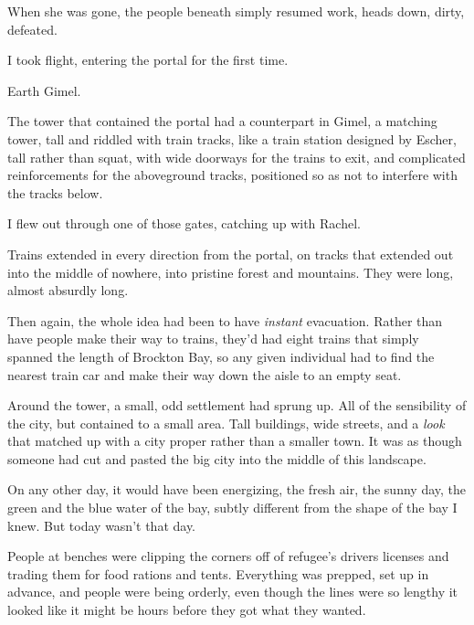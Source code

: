 When she was gone, the people beneath simply resumed work, heads down, dirty, defeated.



I took flight, entering the portal for the first time.



Earth Gimel.



The tower that contained the portal had a counterpart in Gimel, a matching tower, tall and riddled with train tracks, like a train station designed by Escher, tall rather than squat, with wide doorways for the trains to exit, and complicated reinforcements for the aboveground tracks, positioned so as not to interfere with the tracks below.



I flew out through one of those gates, catching up with Rachel.



Trains extended in every direction from the portal, on tracks that extended out into the middle of nowhere, into pristine forest and mountains.  They were long, almost absurdly long.



Then again, the whole idea had been to have \emph{instant} evacuation.  Rather than have people make their way to trains, they'd had eight trains that simply spanned the length of Brockton Bay, so any given individual had to find the nearest train car and make their way down the aisle to an empty seat.



Around the tower, a small, odd settlement had sprung up.  All of the sensibility of the city, but contained to a small area.  Tall buildings, wide streets, and a \emph{look} that matched up with a city proper rather than a smaller town.  It was as though someone had cut and pasted the big city into the middle of this landscape.



On any other day, it would have been energizing, the fresh air, the sunny day, the green and the blue water of the bay, subtly different from the shape of the bay I knew.  But today wasn't that day.



People at benches were clipping the corners off of refugee's drivers licenses and trading them for food rations and tents.  Everything was prepped, set up in advance, and people were being orderly, even though the lines were so lengthy it looked like it might be hours before they got what they wanted.



